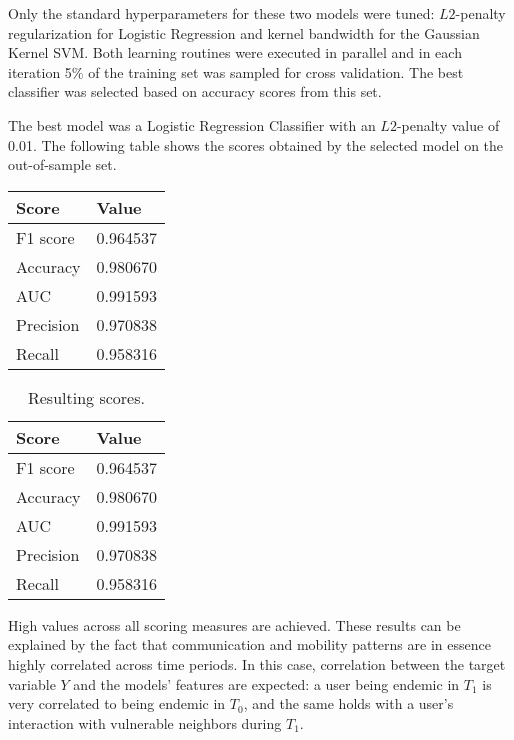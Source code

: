 Only the standard hyperparameters for these two models were tuned: $L2$-penalty regularization for Logistic Regression and kernel bandwidth for the Gaussian Kernel SVM.
Both learning routines were executed in parallel and in each iteration 5\% of the training set was sampled for cross validation. The best classifier was selected based on accuracy scores from this set.



The best model was a Logistic Regression Classifier with an $L2$-penalty value of 0.01. 
The following table
shows the scores obtained by the selected model on the out-of-sample set.

\begin{center}
	\begin{tabular}{ l l }
		\toprule
		Score & Value \\
		\midrule
		F1 score  & 0.964537   \\
		Accuracy  & 0.980670   \\
		AUC       & 0.991593   \\
		Precision & 0.970838   \\
		Recall    & 0.958316   \\
		\bottomrule
	\end{tabular}
\end{center}


\begin{table}[ht]
	\caption{Resulting scores.}
	\label{tab:results}
	\centering
	\begin{tabular}{ l l }
		\toprule
		Score & Value \\
		\midrule
		F1 score  & 0.964537   \\
		Accuracy  & 0.980670   \\
		AUC       & 0.991593   \\
		Precision & 0.970838   \\
		Recall    & 0.958316   \\
		\bottomrule
	\end{tabular}
\end{table}

High values across all scoring measures are achieved. %
These results can be explained by the fact that 
communication and mobility patterns are in essence highly correlated across time periods. 
In this case, correlation between the target variable $Y$ and the models' features are expected:
a user being endemic in $T_1$ is very correlated to being endemic in $T_0$, and the same holds with a user's interaction with vulnerable neighbors during $T_1$.

